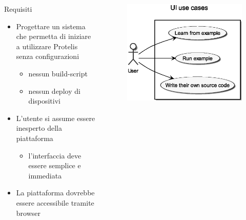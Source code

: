     \begin{frame}{\insertsectionhead}{\insertsubsectionhead}
      \begin{columns}
        \begin{column}{.5\textwidth}
          \begin{block}{Requisiti}
            \begin{itemize}
              \item
                Progettare un sistema che permetta di iniziare a utilizzare Protelis senza configurazioni
                \begin{itemize}
                  \item nessun build-script
                  \item nessun deploy di dispositivi
                \end{itemize}
              \item
                L'utente si assume essere inesperto della piattaforma
                \begin{itemize}
                  \item l'interfaccia deve essere semplice e immediata
                \end{itemize}
              \item La piattaforma dovrebbe essere accessibile tramite browser
            \end{itemize}
          \end{block}
        \end{column}
        \begin{column}{.45\textwidth}
          \begin{figure}
            \includegraphics[width=\textwidth]{res/uml/use-cases-frontend.eps}
          \end{figure}
        \end{column}
      \end{columns}
    \end{frame}

